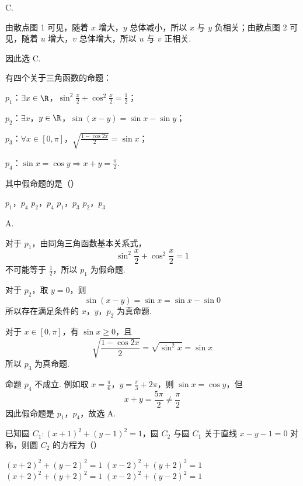\begin{answer}
C.
\end{answer}

\begin{solution}
由散点图 1 可见，随着 \(x\) 增大，\(y\) 总体减小，所以 \(x\) 与 \(y\) 负相关；由散点图 2 可见，随着 \(u\) 增大，\(v\) 总体增大，所以 \(u\) 与 \(v\) 正相关.

因此选 C.
\end{solution}

\begin{problem}
有四个关于三角函数的命题：

\begin{circlelist}
\item \(p_{1}\)：\(\exists x \in \R\)，\(\sin^{2}\frac{x}{2} + \cos^{2}\frac{x}{2} = \frac{1}{2}\)；
\item \(p_{2}\)：\(\exists x\)，\(y \in \R\)，\(\sin(x - y) = \sin x - \sin y\)；
\item \(p_{3}\)：\(\forall x \in [0,\pi]\)，\(\sqrt{\frac{1 - \cos 2x}{2}} = \sin x\)；
\item \(p_{4}\)：\(\sin x = \cos y \Rightarrow x + y = \frac{\pi}{2}\).
\end{circlelist}

其中假命题的是（\quad）

\choices
    {\(p_1\)，\(p_4\)}
    {\(p_{2}\)，\(p_{4}\)}
    {\(p_1\)，\(p_3\)}
    {\(p_2\)，\(p_3\)}
\end{problem}

\begin{answer}
A.
\end{answer}

\begin{solution}
对于 \(p_{1}\)，由同角三角函数基本关系式，
\[
\sin^{2}\frac{x}{2}+\cos^{2}\frac{x}{2}=1
\]
不可能等于 \(\frac12\)，所以 \(p_{1}\) 为假命题.

对于 \(p_{2}\)，取 \(y=0\)，则
\[
\sin(x-y)=\sin x=\sin x-\sin0
\]
所以存在满足条件的 \(x\)，\(y\)，\(p_{2}\) 为真命题.

对于 \(x\in[0,\pi]\)，有 \(\sin x\geqslant0\)，且
\[
\sqrt{\frac{1-\cos2x}{2}}
=\sqrt{\sin^{2}x}=\sin x
\]
所以 \(p_{3}\) 为真命题.

命题 \(p_{4}\) 不成立. 例如取 \(x=\frac{\pi}{6}\)，\(y=\frac{\pi}{3}+2\pi\)，则 \(\sin x=\cos y\)，但
\[
x+y=\frac{5\pi}{2}\ne\frac{\pi}{2}
\]
因此假命题是 \(p_{1}\)，\(p_{4}\)，故选 A.
\end{solution}

\begin{problem}
已知圆 \(C_1: (x + 1)^2 + (y - 1)^2 = 1\)，圆 \(C_2\) 与圆 \(C_1\) 关于直线 \(x - y - 1 = 0\) 对称，则圆 \(C_2\) 的方程为（\quad）

\choices
    {\((x + 2)^{2} + (y - 2)^{2} = 1\)}
    {\((x - 2)^{2} + (y + 2)^{2} = 1\)}
    {\((x + 2)^{2} + (y + 2)^{2} = 1\)}
    {\((x - 2)^{2} + (y - 2)^{2} = 1\)}
\end{problem}


